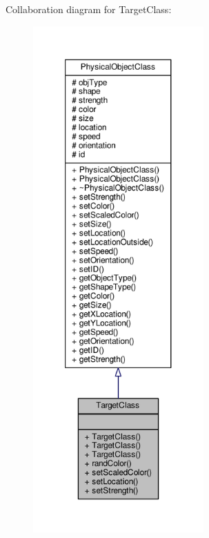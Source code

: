 Collaboration diagram for Target\-Class\-:
\nopagebreak
\begin{figure}[H]
\begin{center}
\leavevmode
\includegraphics[height=550pt]{classTargetClass__coll__graph}
\end{center}
\end{figure}
